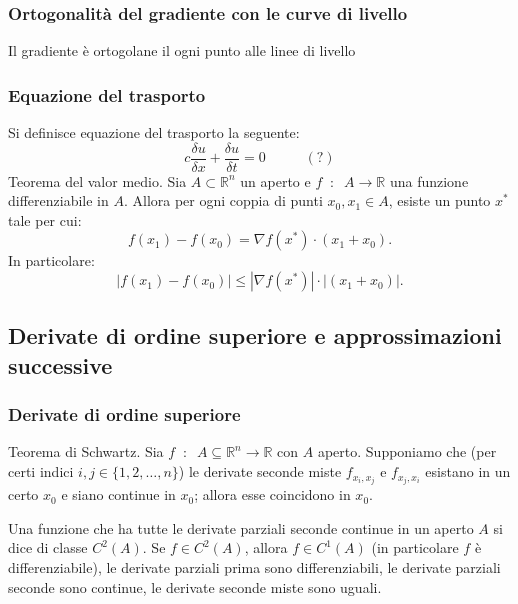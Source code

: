 \subsubsection*{Ortogonalità del gradiente con le curve di livello}
Il gradiente è ortogolane il ogni punto alle linee di livello
\subsubsection*{Equazione del trasporto}
Si definisce equazione del trasporto la seguente:
\[
    c \frac{\delta u}{\delta x} + \frac{\delta u}{\delta t} = 0 \;\;\;\;\; \;\;\;\;\; (?)
\]
\newline
Teorema del valor medio. Sia $A \subset \mathbb{R}^n$ un aperto e $f \;\;:\;\; A \rightarrow \mathbb{R}$ una funzione differenziabile in $A$. Allora per ogni coppia di punti $x_0, x_1 \in A$, esiste un punto $x^*$ tale per cui:
\[
    f(x_1)- f(x_0) = \nabla f(x^*) \cdot  (x_1 + x_0).
\]
In particolare:
\[
    |f(x_1) - f(x_0)| \leq |\nabla f(x^*)| \cdot |(x_1 + x_0)|.
\]
\subsection*{Derivate di ordine superiore e approssimazioni successive}
\subsubsection*{Derivate di ordine superiore}
Teorema di Schwartz. Sia $f \;\;:\;\; A \subseteq \mathbb{R}^n \rightarrow \mathbb{R}$ con $A$ aperto. Supponiamo che (per certi indici $i,j \in \{1,2,\dots,n\}$) le derivate seconde miste $f_{x_i, x_j}$ e $f_{x_j, x_i}$ esistano in un certo $x_0$ e siano continue in $x_0$; allora esse coincidono in $x_0$.\newline

Una funzione che ha tutte le derivate parziali seconde continue in un aperto $A$ si dice di classe $C^2(A)$.\newline
Se $f \in C^2(A)$, allora $f \in C^1(A)$ (in particolare $f$ è differenziabile), le derivate parziali prima sono differenziabili, le derivate parziali seconde sono continue, le derivate seconde miste sono uguali.

